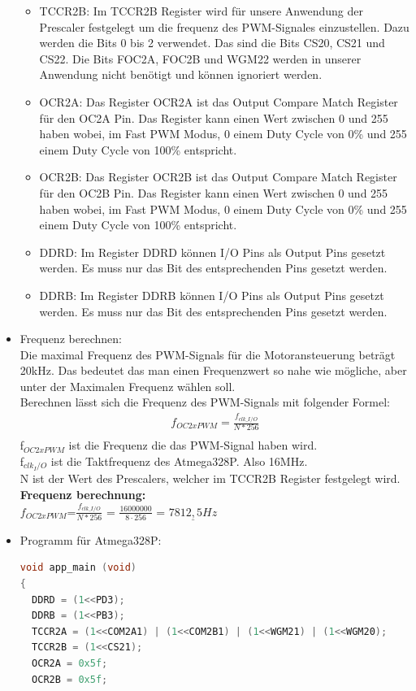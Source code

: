 \begin{itemize}
\begin{itemize}
\begin{itemize}
\end{itemize} 
\item TCCR2B: Im TCCR2B Register wird für unsere Anwendung der Prescaler festgelegt um die frequenz des PWM-Signales einzustellen. Dazu werden die Bits 0 bis 2 verwendet. Das sind die Bits CS20, CS21 und CS22. Die Bits FOC2A, FOC2B und WGM22 werden in unserer Anwendung nicht benötigt und können ignoriert werden. \\
\item OCR2A: Das Register OCR2A ist das Output Compare Match Register für den OC2A Pin. Das Register kann einen Wert zwischen 0 und 255 haben wobei, im Fast PWM Modus, 0 einem Duty Cycle von 0\% und 255 einem Duty Cycle von 100\% entspricht.\\
\item OCR2B: Das Register OCR2B ist das Output Compare Match Register für den OC2B Pin. Das Register kann einen Wert zwischen 0 und 255 haben wobei, im Fast PWM Modus, 0 einem Duty Cycle von 0\% und 255 einem Duty Cycle von 100\% entspricht.\\
\item DDRD: Im Register DDRD können I/O Pins als Output Pins gesetzt werden. Es muss nur das Bit des entsprechenden Pins gesetzt werden.\\
\item DDRB: Im Register DDRB können I/O Pins als Output Pins gesetzt werden. Es muss nur das Bit des entsprechenden Pins gesetzt werden.\\
\end{itemize}
\item Frequenz berechnen:\\
Die maximal Frequenz des PWM-Signals für die Motoransteuerung beträgt 20kHz. Das bedeutet das man einen Frequenzwert so nahe wie mögliche, aber unter der Maximalen Frequenz wählen soll.\\
Berechnen lässt sich die Frequenz des PWM-Signals mit folgender Formel:
\begin{align*}
f_{OC2xPWM}=\frac{f_{clk\_I/O}}{N*256} \\
\end{align*} 
f$_{OC2xPWM}$ ist die Frequenz die das PWM-Signal haben wird.\\
f$_{clk_I/O}$ ist die Taktfrequenz des Atmega328P. Also 16MHz. \\
N ist der Wert des Prescalers, welcher im TCCR2B Register festgelegt wird. \\

\textbf{Frequenz berechnung:}\\
$f_{OC2xPWM}$=$\frac{f_{clk\_I/O}}{N*256}$ = $\frac{16000000}{8 \cdot 256}$ = $\underline{7812,5Hz}$
\item Programm für Atmega328P: \\
\begin{lstlisting}[caption=$\mu$C-Programm,language=c]
void app_main (void)
{
  DDRD = (1<<PD3);
  DDRB = (1<<PB3);
  TCCR2A = (1<<COM2A1) | (1<<COM2B1) | (1<<WGM21) | (1<<WGM20);
  TCCR2B = (1<<CS21);
  OCR2A = 0x5f;
  OCR2B = 0x5f;
  

\end{lstlisting}
\end{itemize}
